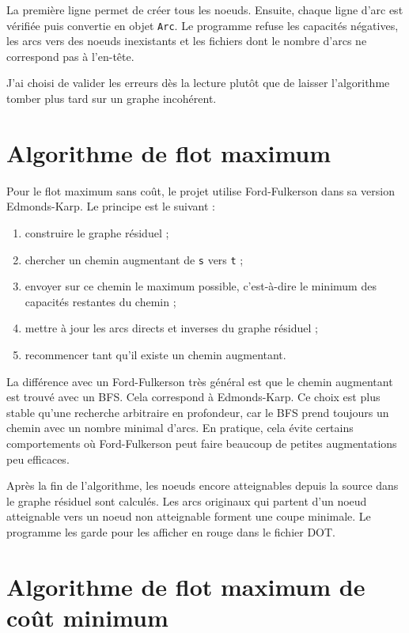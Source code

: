 \documentclass[11pt,a4paper]{article}
\begin{document}
La première ligne permet de créer tous les noeuds. Ensuite, chaque ligne d'arc
est vérifiée puis convertie en objet \texttt{Arc}. Le programme refuse les
capacités négatives, les arcs vers des noeuds inexistants et les fichiers dont
le nombre d'arcs ne correspond pas à l'en-tête.

J'ai choisi de valider les erreurs dès la lecture plutôt que de laisser
l'algorithme tomber plus tard sur un graphe incohérent. 

\section{Algorithme de flot maximum}

Pour le flot maximum sans coût, le projet utilise Ford-Fulkerson dans sa version
Edmonds-Karp. Le principe est le suivant :
\begin{enumerate}
    \item construire le graphe résiduel ;
    \item chercher un chemin augmentant de \texttt{s} vers \texttt{t} ;
    \item envoyer sur ce chemin le maximum possible, c'est-à-dire le minimum des
    capacités restantes du chemin ;
    \item mettre à jour les arcs directs et inverses du graphe résiduel ;
    \item recommencer tant qu'il existe un chemin augmentant.
\end{enumerate}

La différence avec un Ford-Fulkerson très général est que le chemin augmentant
est trouvé avec un BFS. Cela correspond à Edmonds-Karp. Ce choix est plus stable
qu'une recherche arbitraire en profondeur, car le BFS prend toujours un chemin
avec un nombre minimal d'arcs. En pratique, cela évite certains comportements où
Ford-Fulkerson peut faire beaucoup de petites augmentations peu efficaces.

Après la fin de l'algorithme, les noeuds encore atteignables depuis la source
dans le graphe résiduel sont calculés. Les arcs originaux qui partent d'un noeud
atteignable vers un noeud non atteignable forment une coupe minimale. Le
programme les garde pour les afficher en rouge dans le fichier DOT.

\section{Algorithme de flot maximum de coût minimum}
\end{document}
